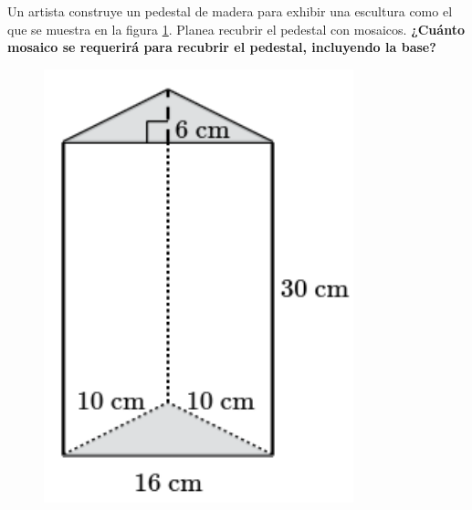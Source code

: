 \question[10] Un artista construye un pedestal de madera para exhibir una escultura como el que se muestra en la figura \ref{fig:prob_verb_superficie_01}.
Planea recubrir el pedestal con mosaicos.
\textbf{¿Cuánto mosaico se requerirá para recubrir el pedestal, incluyendo la base?}

\begin{minipage}{0.3\linewidth}
    \begin{figure}[H]
        \begin{center}
            \includegraphics[width=0.8\textwidth]{../images/prob_verb_superficie_01}
        \end{center}
        \caption{}
        \label{fig:prob_verb_superficie_01}
    \end{figure}
\end{minipage}
\begin{minipage}{0.7\linewidth}
\end{minipage}